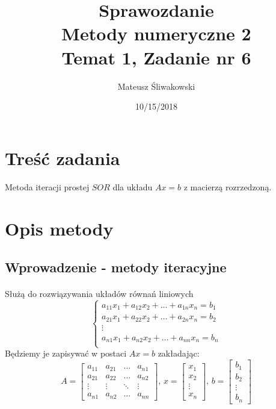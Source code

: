 \documentclass{article}
\title{Sprawozdanie \\Metody numeryczne 2 \\\textbf{Temat 1, Zadanie nr 6}}
\date{10/15/2018}
\author{Mateusz Śliwakowski}
\begin{document}
  \maketitle
  \newpage

\section{Treść zadania}
\paragraph{}
 Metoda iteracji prostej $SOR$ dla układu \(Ax = b\) z macierzą rozrzedzoną.
\section{Opis metody}

\subsection {Wprowadzenie - metody iteracyjne}
\paragraph{}
Służą do rozwiązywania układów równań liniowych
\[
\left\{ 
\begin{array}{c}
a_{11}x_1+a_{12}x_2+\dots+a_{1n}x_n=b_1 \\ 
a_{21}x_1+a_{22}x_2+\dots+a_{2n}x_n=b_2 \\ 
\vdots\\
a_{n1}x_1+a_{n2}x_2+\dots+a_{nn}x_n=b_n \\ 
\end{array}
\right.
\]
Będziemy je zapisywać w postaci \(Ax = b\) zakładając: \\
\[A=\begin{bmatrix}
  a_{11} & a_{21} & \dots & a_{n1}\\
  a_{21} & a_{22} & \dots & a_{n2}\\
 \vdots & \vdots & \ddots & \vdots \\
  a_{n1} & a_{n2} & \dots & a_{nn}
\end{bmatrix},\hspace{2pt}
 x=\begin{bmatrix}
 x_1\\
 x_2\\
 \vdots\\
 x_n
\end{bmatrix}, \hspace{2pt}
 b=\begin{bmatrix}
 b_1\\
 b_2\\
 \vdots\\
 b_n
\end{bmatrix}\]
\end{document}
